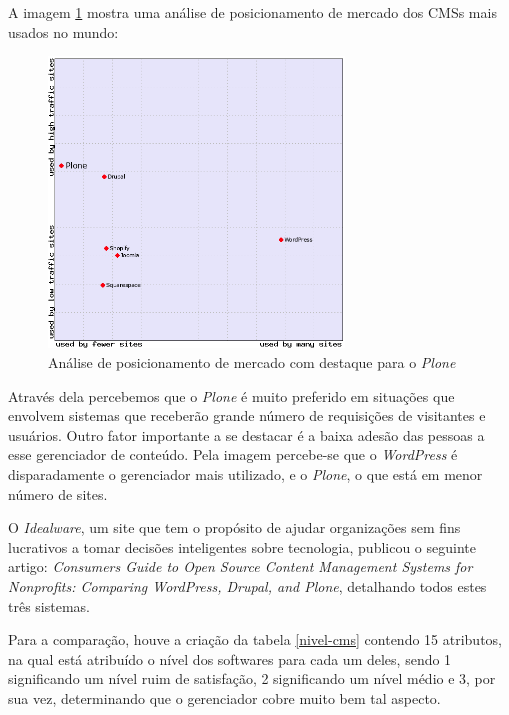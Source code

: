 A imagem \ref{uso-plone-mercado} mostra uma análise de posicionamento de mercado dos CMSs mais usados no mundo:

\begin{figure}[htb]
 \centering
 \caption{Análise de posicionamento de mercado com destaque para o \textit{Plone}}
 \includegraphics[width=0.7\textwidth]{figuras/cms_mercado}
 
 \label{uso-plone-mercado}
\end{figure}

\newpage

Através dela percebemos que o \textit{Plone} é muito preferido em situações que envolvem sistemas que receberão grande número de requisições de visitantes e usuários.
Outro fator importante a se destacar é a baixa adesão das pessoas a esse gerenciador de conteúdo. Pela imagem percebe-se que o \textit{WordPress}
é disparadamente o gerenciador mais utilizado, e o \textit{Plone}, o que está em menor número de sites.

O \textit{Idealware}, um site que tem o propósito de ajudar organizações sem fins lucrativos a tomar decisões inteligentes sobre tecnologia, publicou o seguinte artigo: \textit{Consumers Guide to Open Source Content Management Systems for Nonprofits: Comparing WordPress, Drupal, and Plone}, detalhando todos estes três sistemas.

Para a comparação, houve a criação da tabela \ref{nivel-cms} contendo 15 atributos, na qual está atribuído o nível dos softwares para cada um deles, sendo 1 significando um nível ruim de satisfação, 2 significando um nível médio e 3, por sua vez, determinando que o gerenciador cobre muito bem tal aspecto.

